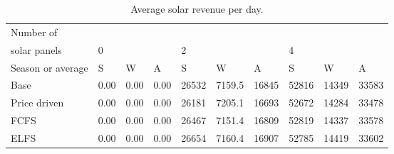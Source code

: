 \begin{table}[h]
\centering
\begin{tabular}{l|lll|lll|lll}Number of \\ solar panels&0& & &2& & &4& & \\ \hline
Season or average & S & W & A & S & W & A & S & W & A \\ \hline
Base&0.00&0.00&0.00&26532&7159.5&16845&52816&14349&33583 \\
Price driven&0.00&0.00&0.00&26181&7205.1&16693&52672&14284&33478 \\
FCFS&0.00&0.00&0.00&26467&7151.4&16809&52819&14337&33578 \\
ELFS&0.00&0.00&0.00&26654&7160.4&16907&52785&14419&33602 \\
\end{tabular}
\caption{Average solar revenue per day.}
\label{avg solar rev}
\end{table}

